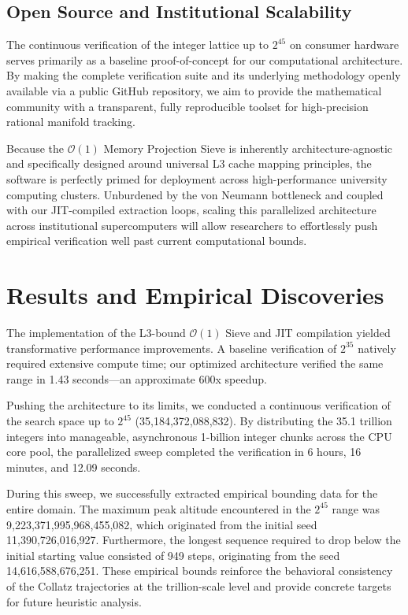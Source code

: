 \documentclass[11pt, a4paper]{article}
\theoremstyle{definition}
\begin{document}
\subsection{Open Source and Institutional Scalability}
The continuous verification of the integer lattice up to $2^{45}$ on consumer hardware serves primarily as a baseline proof-of-concept for our computational architecture. By making the complete verification suite and its underlying methodology openly available via a public GitHub repository, we aim to provide the mathematical community with a transparent, fully reproducible toolset for high-precision rational manifold tracking.

Because the $\mathcal{O}(1)$ Memory Projection Sieve is inherently architecture-agnostic and specifically designed around universal L3 cache mapping principles, the software is perfectly primed for deployment across high-performance university computing clusters. Unburdened by the von Neumann bottleneck and coupled with our JIT-compiled extraction loops, scaling this parallelized architecture across institutional supercomputers will allow researchers to effortlessly push empirical verification well past current computational bounds.

\section{Results and Empirical Discoveries}

The implementation of the L3-bound $\mathcal{O}(1)$ Sieve and JIT compilation yielded transformative performance improvements. A baseline verification of $2^{35}$ natively required extensive compute time; our optimized architecture verified the same range in 1.43 seconds---an approximate 600x speedup.

Pushing the architecture to its limits, we conducted a continuous verification of the search space up to $2^{45}$ (35,184,372,088,832). By distributing the 35.1 trillion integers into manageable, asynchronous 1-billion integer chunks across the CPU core pool, the parallelized sweep completed the verification in 6 hours, 16 minutes, and 12.09 seconds.

During this sweep, we successfully extracted empirical bounding data for the entire domain. The maximum peak altitude encountered in the $2^{45}$ range was 9,223,371,995,968,455,082, which originated from the initial seed 11,390,726,016,927. Furthermore, the longest sequence required to drop below the initial starting value consisted of 949 steps, originating from the seed 14,616,588,676,251. These empirical bounds reinforce the behavioral consistency of the Collatz trajectories at the trillion-scale level and provide concrete targets for future heuristic analysis.
\end{document}

